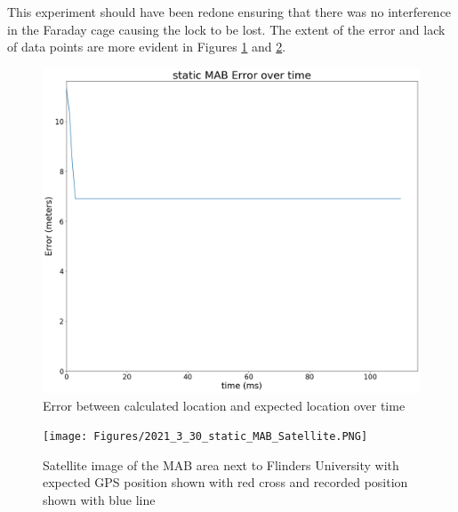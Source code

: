 This
experiment should have been redone ensuring that there was no interference in the Faraday cage causing the lock to be lost. 
The extent of the error and lack of data points are more evident in Figures \ref{fig:MABStaticError} and \ref{fig:MABSatelliteImage}.

\begin{figure}[H]
    \begin{centering}
        \includegraphics[width=12cm,keepaspectratio]{Figures/2021_3_30_static_MAB error over time.png}
        \caption{Error between calculated location and expected location over time}
        \label{fig:MABStaticError}
    \end{centering}
\end{figure}

\begin{figure}[H]
    \begin{centering}
        \texttt{[image: Figures/2021\_3\_30\_static\_MAB\_Satellite.PNG]}
        \caption{Satellite image of the MAB area next to Flinders University with expected GPS position shown with red cross and recorded position shown with blue line}
        \label{fig:MABSatelliteImage}
    \end{centering}
\end{figure}

